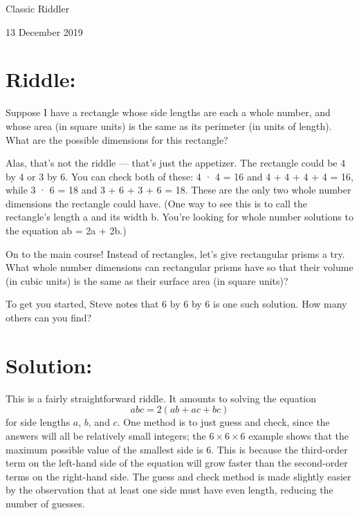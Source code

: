 \documentclass{article}
\begin{document}
\pagestyle{empty} %


\begin{center}
{\LARGE Classic Riddler}

\vspace{0.15in}

{\Large 13 December 2019}
\end{center}


\section*{Riddle:}

Suppose I have a rectangle whose side lengths are each a whole number, and whose area (in square units) is the same as its perimeter (in units of length). What are the possible dimensions for this rectangle?

Alas, that’s not the riddle — that’s just the appetizer. The rectangle could be 4 by 4 or 3 by 6. You can check both of these: 4 · 4 = 16 and 4 + 4 + 4 + 4 = 16, while 3 · 6 = 18 and 3 + 6 + 3 + 6 = 18. These are the only two whole number dimensions the rectangle could have. (One way to see this is to call the rectangle’s length a and its width b. You’re looking for whole number solutions to the equation ab = 2a + 2b.)

On to the main course! Instead of rectangles, let’s give rectangular prisms a try. What whole number dimensions can rectangular prisms have so that their volume (in cubic units) is the same as their surface area (in square units)?

To get you started, Steve notes that 6 by 6 by 6 is one such solution. How many others can you find?


\section*{Solution:}

This is a fairly straightforward riddle.
It amounts to solving the equation
\begin{equation*}
abc=2(ab+ac+bc)
\end{equation*}
for side lengths $a$, $b$, and $c$.
One method is to just guess and check, since the answers will all be relatively small integers; the $6\times6\times6$ example shows that the maximum possible value of the smallest side is 6.
This is because the third-order term on the left-hand side of the equation will grow faster than the second-order terms on the right-hand side.
The guess and check method is made slightly easier by the observation that at least one side must have even length, reducing the number of guesses.
\end{document}

